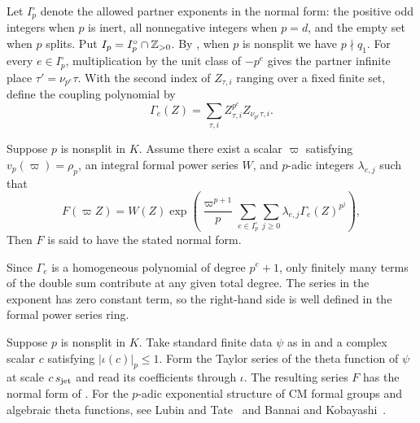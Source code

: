 Let $I_p^\circ$ denote the allowed partner exponents in the normal form: the positive odd integers when $p$ is inert, all nonnegative integers when $p=d$, and the empty set when $p$ splits. Put $I_p=I_p^\circ\cap\mathbb{Z}_{>0}$. By , when $p$ is nonsplit we have $p\nmid q_1$. For every $e\in I_p^\circ$, multiplication by the unit class of $-p^e$ gives the partner infinite place $\tau'=\nu_{p^e}\tau$. With the second index of $Z_{\tau,i}$ ranging over a fixed finite set, define the coupling polynomial by
\begin{equation}
\label{eq:ch2-coupling}
 \Gamma_e(Z)=\sum_{\tau,i}Z_{\tau,i}^{p^e}Z_{\nu_{p^e}\tau,i}.
\end{equation}

\begin{definition}
\label{def:ch2-normal-form}
Suppose $p$ is nonsplit in $K$. Assume there exist a scalar $\varpi$ satisfying $v_p(\varpi)=\rho_p$, an integral formal power series $W$, and $p$-adic integers $\lambda_{e,j}$ such that
\begin{equation}
\label{eq:ch2-normal-form}
 F(\varpi Z)=W(Z)\exp\!\left(
    \frac{\varpi^{p+1}}{p}
    \sum_{e\in I_p^\circ}\sum_{j\ge0}
          \lambda_{e,j}\Gamma_e(Z)^{p^j}
 \right),
\end{equation}
Then $F$ is said to have the stated normal form.
\end{definition}
Since $\Gamma_e$ is a homogeneous polynomial of degree $p^e+1$, only finitely many terms of the double sum contribute at any given total degree. The series in the exponent has zero constant term, so the right-hand side is well defined in the formal power series ring.

\begin{theorem}
\label{thm:ch2-normal-form}
Suppose $p$ is nonsplit in $K$. Take standard finite data $\psi$ as in  and a complex scalar $c$ satisfying $|\iota(c)|_p\le1$. Form the Taylor series of the theta function of $\psi$ at scale $c\,s_{\rm jet}$ and read its coefficients through $\iota$. The resulting series $F$ has the normal form of . For the $p$-adic exponential structure of CM formal groups and algebraic theta functions, see Lubin and Tate~\cite{LubinTate1965} and Bannai and Kobayashi~\cite{BannaiKobayashi2010}.
\end{theorem}

